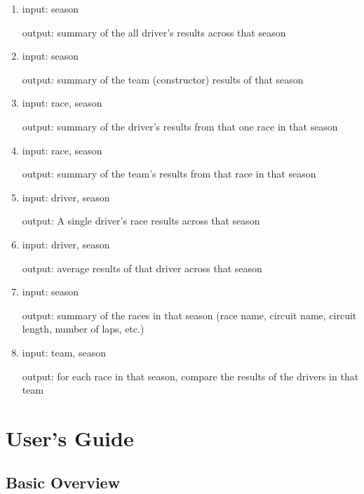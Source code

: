 \documentclass{article} %
\begin{document}
\begin{enumerate}[label=(\arabic*)]
    \item %
    input: season

    output: summary of the all driver's results across that season

    \item %
    input: season

    output: summary of the team (constructor) results of that season

    \item %
    input: race, season 
    
    output: summary of the driver's results from that one race in that season

    \item %
    input: race, season 
    
    output: summary of the team's results from that race in that season

    \item %
    input: driver, season

    output: A single driver's race results across that season 

    \item %
    input: driver, season

    output: average results of that driver across that season

    \item %
    input: season

    output: summary of the races in that season (race name, circuit
    name, circuit length, number of laps, etc.)

    \item %
    input: team, season 

    output: for each race in that season, compare the results of the
    drivers in that team

\end{enumerate}


\section{User's Guide}

\subsection{Basic Overview}
\end{document}
